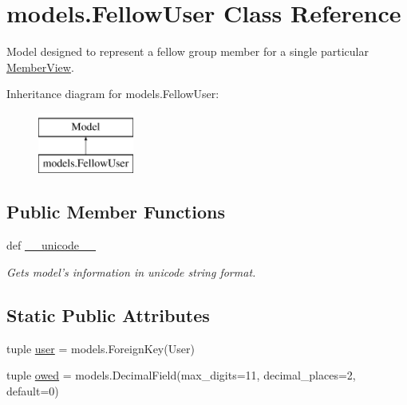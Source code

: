 \hypertarget{classmodels_1_1_fellow_user}{\section{models.\-Fellow\-User Class Reference}
\label{classmodels_1_1_fellow_user}
}


Model designed to represent a fellow group member for a single particular \hyperlink{classmodels_1_1_member_view}{Member\-View}.  


Inheritance diagram for models.\-Fellow\-User\-:\begin{figure}[H]
\begin{center}
\leavevmode
\includegraphics[height=2.000000cm]{classmodels_1_1_fellow_user}
\end{center}
\end{figure}
\subsection*{Public Member Functions}
\begin{DoxyCompactItemize}
\item 
def \hyperlink{classmodels_1_1_fellow_user_ab0b97932b9e3f239b9c65a9878e35381}{\-\_\-\-\_\-unicode\-\_\-\-\_\-}
\begin{DoxyCompactList}\small\item\em Gets model's information in unicode string format. \end{DoxyCompactList}\end{DoxyCompactItemize}
\subsection*{Static Public Attributes}
\begin{DoxyCompactItemize}
\item 
tuple \hyperlink{classmodels_1_1_fellow_user_a5e7120d242fc32956e2b7a0f146d0c86}{user} = models.\-Foreign\-Key(User)
\item 
tuple \hyperlink{classmodels_1_1_fellow_user_aa990390ffe2a4131de17ee9be0afa73b}{owed} = models.\-Decimal\-Field(max\-\_\-digits=11, decimal\-\_\-places=2, default=0)
\end{DoxyCompactItemize}


